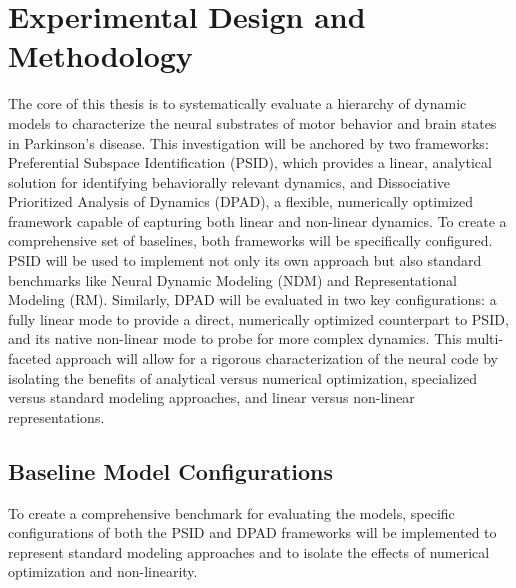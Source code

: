 \documentclass[12pt, a4paper]{article}
\begin{document}
\section{Experimental Design and Methodology}

The core of this thesis is to systematically evaluate a hierarchy of dynamic models to characterize the neural substrates of motor behavior and brain states in Parkinson's disease. This investigation will be anchored by two frameworks: Preferential Subspace Identification (PSID), which provides a linear, analytical solution for identifying behaviorally relevant dynamics, and Dissociative Prioritized Analysis of Dynamics (DPAD), a flexible, numerically optimized framework capable of capturing both linear and non-linear dynamics. To create a comprehensive set of baselines, both frameworks will be specifically configured. PSID will be used to implement not only its own approach but also standard benchmarks like Neural Dynamic Modeling (NDM) and Representational Modeling (RM). Similarly, DPAD will be evaluated in two key configurations: a fully linear mode to provide a direct, numerically optimized counterpart to PSID, and its native non-linear mode to probe for more complex dynamics. This multi-faceted approach will allow for a rigorous characterization of the neural code by isolating the benefits of analytical versus numerical optimization, specialized versus standard modeling approaches, and linear versus non-linear representations.

\subsection{Baseline Model Configurations}
To create a comprehensive benchmark for evaluating the models, specific configurations of both the PSID and DPAD frameworks will be implemented to represent standard modeling approaches and to isolate the effects of numerical optimization and non-linearity.
\end{document}

